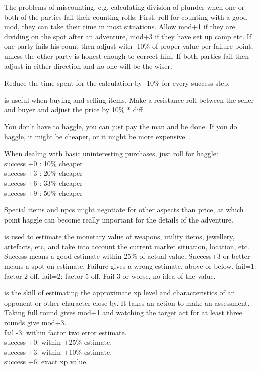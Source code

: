 The problems of miscounting, e.g. calculating division of plunder when one or both of the parties fail their counting rolls: First, roll for counting with a good mod, they can take their time in most situations. Allow mod+1 if they are dividing on the spot after an adventure, mod+3 if they have set up camp etc.
If one party fails his count then adjust with -10\% of proper value per failure point, unless the other party is honest enough to correct him. If both parties fail then adjust in either direction and no-one will be the wiser.

Reduce the time spent for the calculation by -10\% for every success step.


 is useful when buying and selling items. Make a resistance roll between the seller and buyer and adjust the price by 10\% * diff.

You don't have to haggle, you can just pay the man and be done. If you do haggle, it might be cheaper, or it might be more expensive...

When dealing with basic uninteresting purchases, just roll for haggle: \\
success +0 : 10\% cheaper \\
success +3 : 20\% cheaper \\
success +6 : 33\% cheaper \\
success +9 : 50\% cheaper

Special items and npcs might negotiate for other aspects than price, at which point haggle can become really important for the details of the adventure.


 is used to estimate the monetary value of weapons, utility items, jewellery, artefacts, etc, and take into account the current market situation, location, etc.
Success means a good estimate within 25\% of actual value. Success+3 or better means a spot on estimate. Failure gives a wrong estimate, above or below. fail=1: factor 2 off. fail=2: factor 5 off. Fail 3 or worse, no idea of the value.


 is the skill of estimating the approximate xp level and characteristics of an opponent or other character close by. It takes an action to make an assessment. Taking full round gives mod+1 and watching the target act for at least three rounds give mod+3. \\
fail -3: within factor two error estimate. \\
success +0: within $\pm$25\% estimate. \\
success +3: within $\pm$10\% estimate. \\
success +6: exact xp value.


